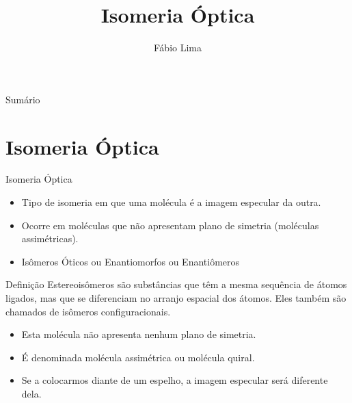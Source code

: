 \documentclass[presentation,professionalfonts,aspectratio=169]{beamer}
\date{}
\author{Fábio Lima}
\date{}
\title{ Isomeria Óptica}
\begin{document}
\begingroup
  \maketitle
  \endgroup
\begin{frame}{Sumário}
\tableofcontents
\end{frame}



\section{Isomeria Óptica}
\label{sec:orgb9bf24b}

\begin{frame}[label={sec:orgc648da3}]{Isomeria Óptica}
\begin{itemize}
\item Tipo de isomeria em que uma molécula é a imagem especular da outra.
\item Ocorre em moléculas que não apresentam plano de simetria (moléculas assimétricas).
\item \alert{Isômeros Óticos} ou \alert{Enantiomorfos} ou \alert{Enantiômeros}
\end{itemize}

\begin{bclogo}[couleur=blue!30 , arrondi=0.1 , logo=\bcplume , epBarre=3.5]{Definição}
\alert{Estereoisômeros} são substâncias que têm a mesma sequência de átomos ligados, mas que se diferenciam no arranjo espacial dos átomos. Eles também são chamados de isômeros configuracionais.
\end{bclogo}
\end{frame}


\begin{frame}[label={sec:org08c99e6}]{}
\begin{itemize}
\item Esta molécula não apresenta nenhum plano de simetria.
\item É denominada molécula assimétrica ou molécula \alert{quiral}.
\item Se a colocarmos diante de um espelho, a imagem especular será diferente dela.
\end{itemize}
\end{frame}
\end{document}
